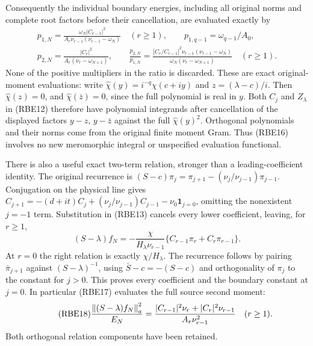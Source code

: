Consequently the individual boundary energies, including all
original norms and complete root factors before their cancellation,
are evaluated exactly by
\begin{equation}\tag{RBE16}
 \begin{gathered}
 p_{1,N}=\frac{\omega_N|C_{r-1}|^2}
 {A_r\nu_{r-1}(\nu_{r-1}-\omega_N)}\quad(r\ge1),\qquad
 p_{1,q-1}=\omega_{q-1}/A_0,\\
 p_{2,N}=\frac{|C_r|^2}{A_r(\nu_r-\omega_{N+1})},\qquad
 \frac{p_{2,N}}{p_{1,N}}
 =\frac{|C_r/C_{r-1}|^2\nu_{r-1}(\nu_{r-1}-\omega_N)}
 {\omega_N(\nu_r-\omega_{N+1})}\quad(r\ge1).
 \end{gathered}
\end{equation}
None of the positive multipliers in the ratio is discarded.
These are exact original-moment evaluations: write
\(\widehat\chi(y)=i^{-q}\chi(c+iy)\) and
\(z=(\lambda-c)/i\). Then \(\widehat\chi(z)=0\), and
\(\widehat\chi(\bar z)=0\), since the full polynomial is
real in \(y\). Both \(C_j\) and \(Z_\lambda\) in (RBE12)
therefore have polynomial integrands after cancellation of the
displayed factors \(y-z\), \(y-\bar z\) against the full
\(\widehat\chi(y)^2\). Orthogonal polynomials and their norms
come from the original finite moment Gram. Thus (RBE16) involves
no new meromorphic integral or unspecified evaluation functional.

There is also a useful exact two-term relation, stronger than a
leading-coefficient identity. The original recurrence is
\((S-c)\pi_j=\pi_{j+1}-(\nu_j/\nu_{j-1})\pi_{j-1}\).
Conjugation on the physical line gives
\(C_{j+1}=-(d+it)C_j+(\nu_j/\nu_{j-1})C_{j-1}
-\nu_0\mathbf1_{j=0}\), omitting the nonexistent \(j=-1\)
term. Substitution in (RBE13) cancels every lower coefficient,
leaving, for \(r\ge1\),
\begin{equation}\tag{RBE17}
 (S-\lambda)f_N
 =-\frac{\chi}{H_\lambda\nu_{r-1}}
        \{C_{r-1}\pi_r+C_r\pi_{r-1}\}.
\end{equation}
At \(r=0\) the right relation is exactly \(\chi/H_\lambda\).
The recurrence follows by pairing \(\bar\pi_{j+1}\) against
\((S-\lambda)^{-1}\), using \(\bar S-c=-(S-c)\) and
orthogonality of \(\pi_j\) to the constant for \(j>0\).
This proves every coefficient and the boundary constant at \(j=0\).
In particular (RBE17) evaluates the full source second moment:
\begin{equation}\tag{RBE18}
 \frac{\left\lVert(S-\lambda)f_N\right\rVert_a^2}{E_N}
 =\frac{|C_{r-1}|^2\nu_r+|C_r|^2\nu_{r-1}}
        {A_r\nu_{r-1}^2}\quad(r\ge1).
\end{equation}
Both orthogonal relation components have been retained.

